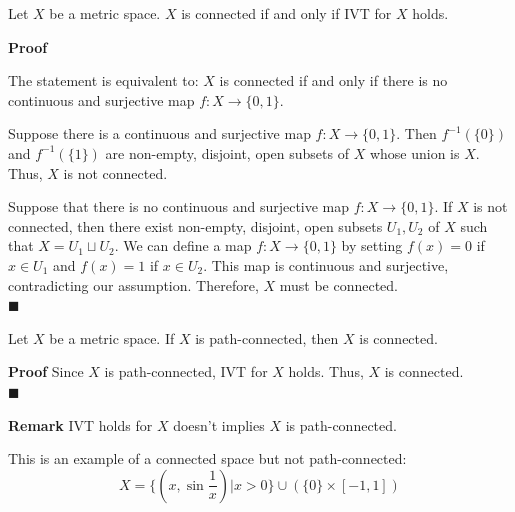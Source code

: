 \documentclass[main.tex]{subfiles}
\begin{document}
\begin{property}
    Let $X$ be a metric space. $X$ is connected if and only if IVT for $X$ holds.
\end{property}
\par \noindent \textbf{Proof} 
\par The statement is equivalent to: $X$ is connected if and only if there is no continuous and surjective map $f: X \rightarrow \{0, 1\}$. 
\par Suppose there is a continuous and surjective map $f: X \rightarrow \{0, 1\}$. Then $f^{-1}(\{0\})$ and $f^{-1}(\{1\})$ are non-empty, disjoint, open subsets of $X$ whose union is $X$. Thus, $X$ is not connected. 
\par Suppose that there is no continuous and surjective map $f: X \rightarrow \{0, 1\}$. If $X$ is not connected, then there exist non-empty, disjoint, open subsets $U_1, U_2$ of $X$ such that $X = U_1 \sqcup U_2$. We can define a map $f: X \rightarrow \{0, 1\}$ by setting $f(x) = 0$ if $x \in U_1$ and $f(x) = 1$ if $x \in U_2$. This map is continuous and surjective, contradicting our assumption. Therefore, $X$ must be connected.
\mbox{} \\ \null \hfill $\blacksquare$ 

\begin{corollary}
    Let $X$ be a metric space. If $X$ is path-connected, then $X$ is connected. 
\end{corollary} 
\par \noindent \textbf{Proof} Since $X$ is path-connected, IVT for $X$ holds. Thus, $X$ is connected.
\mbox{} \\ \null \hfill $\blacksquare$ 

\par \noindent \textbf{Remark} IVT holds for $X$ doesn't implies $X$ is path-connected. 
\begin{example}
    This is an example of a connected space but not path-connected:
    \begin{equation}
        X = \{(x, \sin{\frac{1}{x}}) | x > 0\} \cup (\{0\}\times [-1, 1])
    \end{equation}
\end{example}
\end{document}
